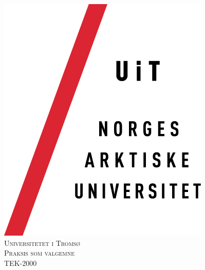 \documentclass[12pt, a4paper]{article}
\begin{document}
\begin{titlepage}

\newcommand{\HRule}{\rule{\linewidth}{0.5mm}} %

\center %
 

\vspace*{-3.5cm}\hspace*{-16cm}\includegraphics{uitlogo.png}\\[3.0cm] %
\vspace*{-1.0cm}\textsc{\LARGE Universitetet i Tromsø}\\[2.5cm] %
\textsc{\Large Praksis som valgemne}\\[0.5cm] %
\textsc{\large TEK-2000}\\[0.5cm] %



\end{titlepage}
\end{document}
